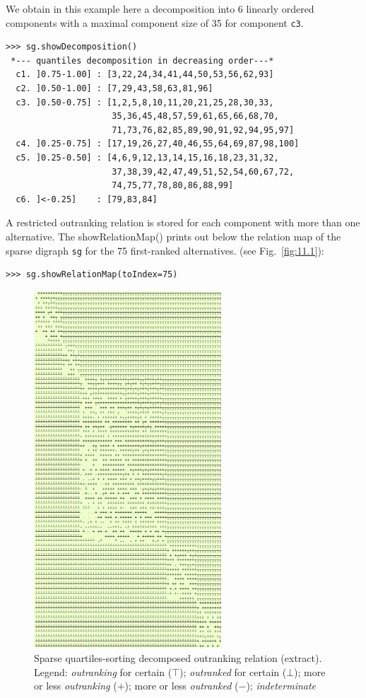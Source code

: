 We obtain in this example here a decomposition into 6 linearly ordered components with a maximal component size of 35 for component \texttt{c3}.

\begin{lstlisting}
>>> sg.showDecomposition()
 *--- quantiles decomposition in decreasing order---*
  c1. ]0.75-1.00] : [3,22,24,34,41,44,50,53,56,62,93]
  c2. ]0.50-1.00] : [7,29,43,58,63,81,96]
  c3. ]0.50-0.75] : [1,2,5,8,10,11,20,21,25,28,30,33,
                     35,36,45,48,57,59,61,65,66,68,70,
                     71,73,76,82,85,89,90,91,92,94,95,97]
  c4. ]0.25-0.75] : [17,19,26,27,40,46,55,64,69,87,98,100]
  c5. ]0.25-0.50] : [4,6,9,12,13,14,15,16,18,23,31,32,
                     37,38,39,42,47,49,51,52,54,60,67,72,
                     74,75,77,78,80,86,88,99]
  c6. ]<-0.25]    : [79,83,84]
\end{lstlisting}

A restricted outranking relation is stored for each component with more than one alternative. The showRelationMap() prints out below the relation map of the sparse digraph \texttt{sg} for the 75 first-ranked alternatives. (see Fig.~\vref{fig:11.1}):
\begin{lstlisting}
>>> sg.showRelationMap(toIndex=75)
\end{lstlisting}  
\begin{figure}[ht]
\sidecaption[t]
\includegraphics[width=7cm]{Figures/11-1-sparseRelationMap.png}
\caption{Sparse quartiles-sorting decomposed outranking relation (extract). Legend: \emph{outranking} for certain ($\top$); \emph{outranked} for certain ($\bot$); more or less \emph{outranking} ($+$); more or less \emph{outranked} ($-$); \emph{indeterminate}}
\label{fig:11.1}       %
\end{figure}

